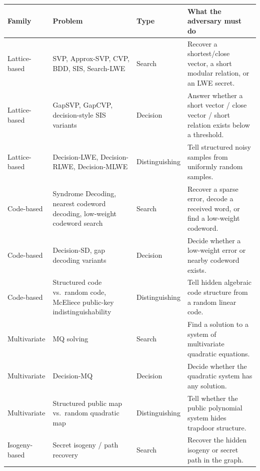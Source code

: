 \documentclass[11pt]{article}
\begin{document}
	\begin{center}
		\small
		\renewcommand{\arraystretch}{1.35}
		\begin{tabular}{|p{2.2cm}|p{3.8cm}|p{2cm}|p{6.7cm}|}
			\hline
			\textbf{Family} & \textbf{Problem} & \textbf{Type} & \textbf{What the adversary must do} \\
			\hline
			
			Lattice-based & SVP, Approx-SVP, CVP, BDD, SIS, Search-LWE & Search & Recover a shortest/close vector, a short modular relation, or an LWE secret. \\
			\hline
			
			Lattice-based & GapSVP, GapCVP, decision-style SIS variants & Decision & Answer whether a short vector / close vector / short relation exists below a threshold. \\
			\hline
			
			Lattice-based & Decision-LWE, Decision-RLWE, Decision-MLWE & Distinguishing & Tell structured noisy samples from uniformly random samples. \\
			\hline
			
			Code-based & Syndrome Decoding, nearest codeword decoding, low-weight codeword search & Search & Recover a sparse error, decode a received word, or find a low-weight codeword. \\
			\hline
			
			Code-based & Decision-SD, gap decoding variants & Decision & Decide whether a low-weight error or nearby codeword exists. \\
			\hline
			
			Code-based & Structured code vs.\ random code, McEliece public-key indistinguishability & Distinguishing & Tell hidden algebraic code structure from a random linear code. \\
			\hline
			
			Multivariate & MQ solving & Search & Find a solution to a system of multivariate quadratic equations. \\
			\hline
			
			Multivariate & Decision-MQ & Decision & Decide whether the quadratic system has any solution. \\
			\hline
			
			Multivariate & Structured public map vs.\ random quadratic map & Distinguishing & Tell whether the public polynomial system hides trapdoor structure. \\
			\hline
			
			Isogeny-based & Secret isogeny / path recovery & Search & Recover the hidden isogeny or secret path in the graph. \\
			\hline
			

\end{tabular}
\end{center}
\end{document}
